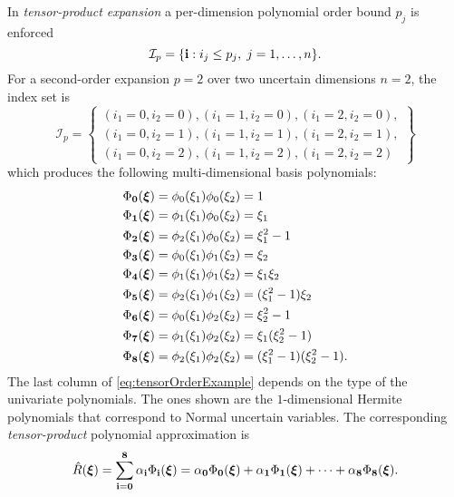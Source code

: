 In \textit{tensor-product expansion} a per-dimension polynomial order bound \(p_j\) is enforced
\begin{equation}
	\mathcal{I}_p = \{\mathbf{i}:i_j \leq p_j, \; j=1,\ldots ,n \}.
\end{equation}
For a second-order expansion \(p=2\) over two uncertain dimensions \(n=2\), the index set is
\begin{equation}
  \mathcal{I}_p = \left \{\begin{array}{c}
	(i_1=0,i_2=0),(i_1=1,i_2=0),(i_1=2,i_2=0),\\
	(i_1=0,i_2=1),(i_1=1,i_2=1),(i_1=2,i_2=1),\\
    (i_1=0,i_2=2),(i_1=1,i_2=2),(i_1=2,i_2=2)
\end{array}\right \}
\end{equation}
which produces the following multi-dimensional basis polynomials:
\begin{equation}
\begin{alignedat}{2}
  \Phi_\mathbf{0}(\boldsymbol{\xi}) & = \phi_0(\xi_1) \phi_0(\xi_2) & & = 1 \\
  \Phi_\mathbf{1}(\boldsymbol{\xi}) & = \phi_1(\xi_1) \phi_0(\xi_2) & & = \xi_1 \\
  \Phi_\mathbf{2}(\boldsymbol{\xi}) & = \phi_2(\xi_1) \phi_0(\xi_2) & & = \xi_1^2-1 \\
  \Phi_\mathbf{3}(\boldsymbol{\xi}) & = \phi_0(\xi_1) \phi_1(\xi_2) & & = \xi_2 \\
  \Phi_\mathbf{4}(\boldsymbol{\xi}) & = \phi_1(\xi_1) \phi_1(\xi_2) & & = \xi_1 \xi_2 \\
  \Phi_\mathbf{5}(\boldsymbol{\xi}) & = \phi_2(\xi_1) \phi_1(\xi_2) & & = (\xi_1^2-1)\xi_2 \\
  \Phi_\mathbf{6}(\boldsymbol{\xi}) & = \phi_0(\xi_1) \phi_2(\xi_2) & & = \xi_2^2-1 \\
  \Phi_\mathbf{7}(\boldsymbol{\xi}) & = \phi_1(\xi_1) \phi_2(\xi_2) & & = \xi_1 (\xi_2^2-1) \\
  \Phi_\mathbf{8}(\boldsymbol{\xi}) & = \phi_2(\xi_1) \phi_2(\xi_2) & & = (\xi_1^2-1) (\xi_2^2-1).
\end{alignedat}
\label{eq:tensorOrderExample}
\end{equation}
The last column of \cref{eq:tensorOrderExample} depends on the type of the univariate polynomials. The ones shown are the $1$-dimensional Hermite polynomials that correspond to Normal uncertain variables.
The corresponding \textit{tensor-product} polynomial approximation is
\begin{equation}
  \hat{R}(\boldsymbol{\xi}) = \sum_{\mathbf{i}=\mathbf{0}}^{\mathbf{8}}\alpha_{\mathbf{i}} \Phi_{\mathbf{i}}(\boldsymbol{\xi}) = \alpha_{\mathbf{0}} \Phi_\mathbf{0}(\boldsymbol{\xi}) + \alpha_{\mathbf{1}} \Phi_\mathbf{1}(\boldsymbol{\xi}) + \cdots + \alpha_{\mathbf{8}} \Phi_\mathbf{8}(\boldsymbol{\xi}).
\end{equation}
